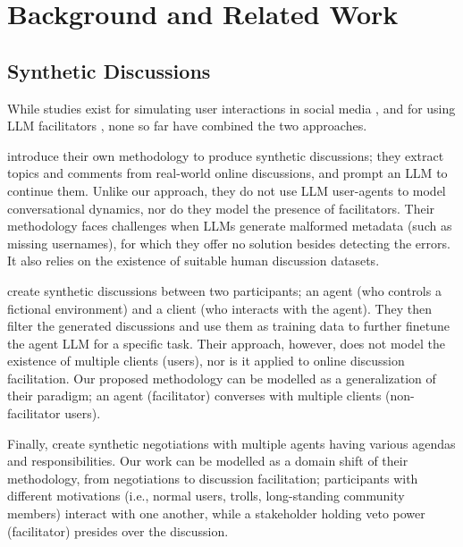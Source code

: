 %
\section{Background and Related Work}

\subsection{Synthetic Discussions}
\label{ssec:related:discussions}

While studies exist for simulating user interactions in social media \cite{park_simulacra, mou_2024, tornberg_2023, y_social, balog_2024}, and for using \ac{LLM} facilitators \cite{kim_et_al_chatbot, cho-etal-2024-language}, none so far have combined the two approaches. 

\citet{balog_2024} introduce their own methodology to produce synthetic discussions; they extract topics and comments from real-world online discussions, and prompt an \ac{LLM} to continue them. Unlike our approach, they do not use \ac{LLM} user-agents to model conversational dynamics, nor do they model the presence of facilitators. Their methodology faces challenges when \acp{LLM} generate malformed metadata (such as missing usernames), for which they offer no solution besides detecting the errors. It also relies on the existence of suitable human discussion datasets.

\citet{ulmer2024} create synthetic discussions between two participants; an agent (who controls a fictional environment) and a client (who interacts with the agent). They then filter the generated discussions and use them as training data to further finetune the agent \ac{LLM} for a specific task. Their approach, however, does not model the existence of multiple clients (users), nor is it applied to online discussion facilitation. Our proposed methodology can be modelled as a generalization of their paradigm; an agent (facilitator) converses with multiple clients (non-facilitator users).

Finally, \citet{abdelnabi_negotiations} create synthetic negotiations with multiple agents having various agendas and responsibilities. Our work can be modelled as a domain shift of their methodology, from negotiations to discussion facilitation; participants with different motivations (i.e., normal users, trolls, long-standing community members) interact with one another, while a stakeholder holding veto power (facilitator) presides over the discussion.


